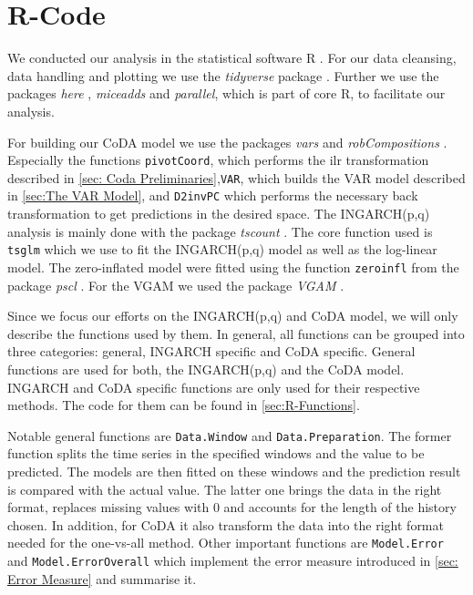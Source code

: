 \section{R-Code}
\label{sec:R-Code}

We conducted our analysis in the statistical software R \cite{R:2022}. For our data cleansing, data handling and plotting we use the \textit{tidyverse} package \cite{Tidyverse:2019}. Further we use the packages \textit{here} \cite{here:2020}, \textit{miceadds} \cite{Miceadds:2023} and \textit{parallel}, which is part of core R, to facilitate our analysis.  

For building our CoDA model we use the packages \textit{vars} \cite{VAR:2008,CoDAR2:2008} and \textit{robCompositions} \cite{RobComp:2011,CoDAR4:2018}. Especially the functions \texttt{pivotCoord}, which performs the ilr transformation described in \ref{sec: Coda Preliminaries},\texttt{VAR}, which builds the VAR model described in \ref{sec:The VAR Model}, and \texttt{D2invPC} which performs the necessary back transformation to get predictions in the desired space. The INGARCH(p,q) analysis is mainly done with the package \textit{tscount} \cite{Tscount:2017,Tscount:2020}. The core function used is \texttt{tsglm} which we use to fit the INGARCH(p,q) model as well as the log-linear model. The zero-inflated model were fitted using the function \texttt{zeroinfl} from the package \textit{pscl} \cite{Pscl:2008}. For the VGAM we used the package \textit{VGAM} \cite{RVGAM:2010}. 

Since we focus our efforts on the INGARCH(p,q) and CoDA model, we will only describe the functions used by them. In general, all functions can be grouped into three categories: general, INGARCH specific and CoDA specific. General functions are used for both, the INGARCH(p,q) and the CoDA model. INGARCH and CoDA specific functions are only used for their respective methods. The code for them can be found in \ref{sec:R-Functions}. 

Notable general functions are \texttt{Data.Window} and \texttt{Data.Preparation}. The former function splits the time series in the specified windows and the value to be predicted. The models are then fitted on these windows and the prediction result is compared with the actual value. The latter one brings the data in the right format, replaces missing values with 0 and accounts for the length of the history chosen. In addition, for CoDA it also transform the data into the right format needed for the one-vs-all method. Other important functions are \texttt{Model.Error} and \texttt{Model.ErrorOverall} which implement the error measure introduced in \ref{sec: Error Measure} and summarise it. 

